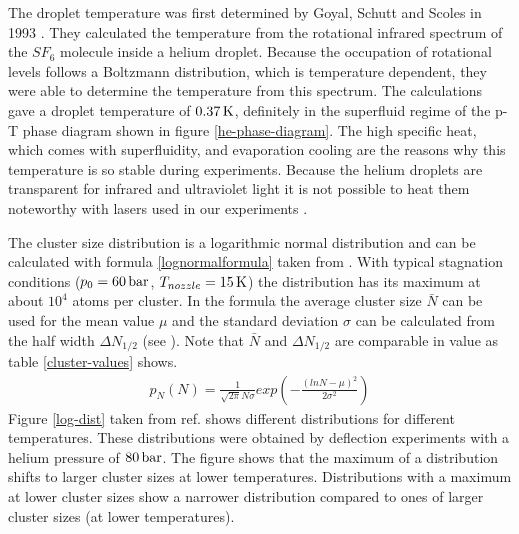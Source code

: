 \documentclass[parskip,12pt,headsepline,a4paper] {scrbook}
\begin{document}
The droplet temperature was first determined by Goyal, Schutt and Scoles in 1993 \cite{he-temp}. They calculated the temperature from the rotational infrared spectrum of the $SF_6$ molecule inside a helium droplet. Because the occupation of rotational levels follows a Boltzmann distribution, which is temperature dependent, they were able to determine the temperature from this spectrum. The calculations gave a droplet temperature of $\unit[0.37]{K}$, definitely in the superfluid regime of the p-T phase diagram shown in figure \ref{he-phase-diagram}. The high specific heat, which comes with superfluidity, and evaporation cooling are the reasons why this temperature is so stable during experiments. Because the helium droplets are transparent for infrared and ultraviolet light it is not possible to heat them noteworthy with lasers used in our experiments \cite{laser-heating}.

The cluster size distribution is a logarithmic normal distribution and can be calculated with formula \ref{lognormalformula} taken from \cite{speed-distr}. With typical stagnation conditions ($p_0 = \unit[60]{bar}$, $T_{nozzle} = \unit[15]{K}$) the distribution has its maximum at about $10^4$ atoms per cluster. In the formula the average cluster size $\bar{N}$ can be used for the mean value $\mu$ and the standard deviation $\sigma$ can be calculated from the half width $\Delta N_{1/2}$ (see \cite{speed-distr}). Note that $\bar{N}$ and $\Delta N_{1/2}$ are comparable in value as table \ref{cluster-values} shows.
\begin{align}  \label{lognormalformula}
p_N(N) = \frac{1}{\sqrt{2\pi}N \sigma} exp\left(- \frac{(lnN - \mu)^2}{2\sigma^2}\right)
\end{align}
Figure \ref{log-dist} taken from ref. \cite{loga-distributions} shows different distributions for different temperatures. These distributions were obtained by deflection experiments with a helium pressure of $\unit[80]{bar}$. The figure shows that the maximum of a distribution shifts to larger cluster sizes at lower temperatures. Distributions with a maximum at lower cluster sizes show a narrower distribution compared to ones of larger cluster sizes (at lower temperatures).
\end{document}
